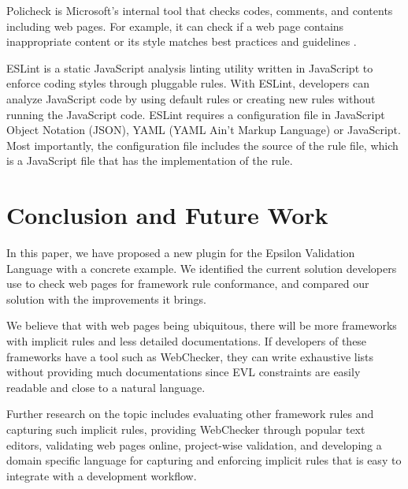 \documentclass[conference]{IEEETran}
\begin{document}
Policheck is Microsoft's internal tool that checks codes, comments, and contents including web pages. For example, it can check if a web page contains inappropriate content or its style matches best practices and guidelines \cite{christakis16}.

ESLint \cite{eslint} is a static JavaScript analysis linting utility written in JavaScript to enforce coding styles through pluggable rules. With ESLint, developers can analyze JavaScript code by using default rules or creating new rules without running the JavaScript code. ESLint requires a configuration file in JavaScript Object Notation (JSON), YAML (YAML Ain't Markup Language) or JavaScript. Most importantly, the configuration file includes the source of the rule file, which is a JavaScript file that has the implementation of the rule.    
 


\section{Conclusion and Future Work}

In this paper, we have proposed a new plugin for the Epsilon Validation Language with a concrete example. We identified the current solution developers use to check web pages for framework rule conformance, and compared our solution with the improvements it brings. 

We believe that with web pages being ubiquitous, there will be more frameworks with implicit rules and less detailed documentations. If developers of these frameworks have a tool such as WebChecker, they can write exhaustive lists without providing much documentations since EVL constraints are easily readable and close to a natural language. 

Further research on the topic includes evaluating other framework rules and capturing such implicit rules, providing WebChecker through popular text editors, validating web pages online, project-wise validation, and developing a domain specific language for capturing and enforcing implicit rules that is easy to integrate with a development workflow.


 
\end{document}
